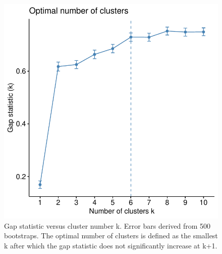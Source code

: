\begin{figure}
    \centering
    \includegraphics[width=1.0\textwidth,page=1]{mainmatter/figures/chapter_04/plot_gene_set_enrichment.spline_fviz_nbclust_gap_stat.pdf}
    \caption{Gap statistic versus cluster number k. Error bars derived from 500 bootstraps. The optimal number of clusters is defined as the smallest k after which the gap statistic does not significantly increase at k+1.}
    \label{fig:multipants_dge_spline_fviz_nbclust_gap_stat}
\end{figure}

